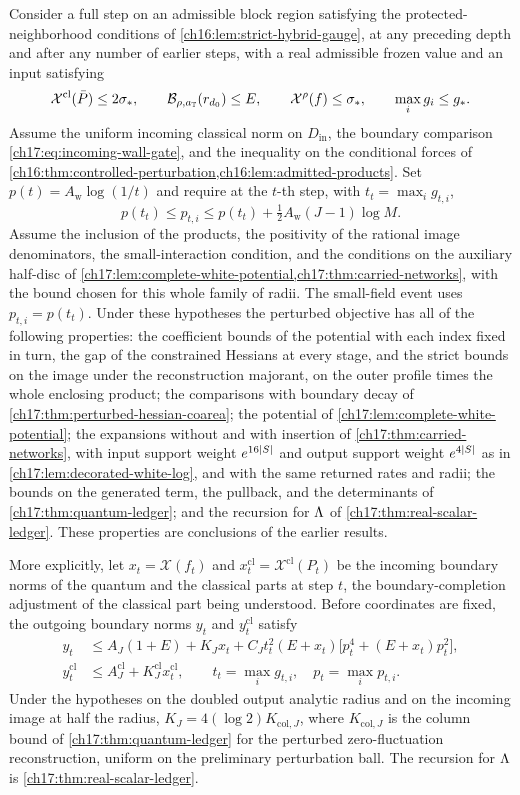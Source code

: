 \begin{theorem}
Consider a full step on an admissible block region satisfying the protected-neighborhood conditions of \cref{ch16:lem:strict-hybrid-gauge}, at any preceding depth and after any number of earlier steps, with a real admissible frozen value and an input satisfying
\[
 \mathcal X^{\mathrm{cl}}(\bar P)\le2\sigma_*,\qquad\mathcal B_{\rho,a_{\mathbb T}}(r_{d_0})\le E,\qquad\mathcal X^\rho(f)\le\sigma_*,\qquad\max_ig_i\le g_*.
\]
Assume the uniform incoming classical norm on $D_{\mathrm{in}}$, the boundary comparison \eqref{ch17:eq:incoming-wall-gate}, and the inequality on the conditional forces of \cref{ch16:thm:controlled-perturbation,ch16:lem:admitted-products}. Set $p(t)=A_{\mathrm w}\log(1/t)$ and require at the $t$-th step, with $t_t=\max_ig_{t,i}$,
\[
 p(t_t)\le p_{t,i}\le p(t_t)+\tfrac12A_{\mathrm w}(J-1)\log M.
\]
Assume the inclusion of the products, the positivity of the rational image denominators, the small-interaction condition, and the conditions on the auxiliary half-disc of \cref{ch17:lem:complete-white-potential,ch17:thm:carried-networks}, with the bound chosen for this whole family of radii. The small-field event uses $p_{t,i}=p(t_t)$. Under these hypotheses the perturbed objective has all of the following properties: the coefficient bounds of the potential with each index fixed in turn, the gap of the constrained Hessians at every stage, and the strict bounds on the image under the reconstruction majorant, on the outer profile times the whole enclosing product; the comparisons with boundary decay of \cref{ch17:thm:perturbed-hessian-coarea}; the potential of \cref{ch17:lem:complete-white-potential}; the expansions without and with insertion of \cref{ch17:thm:carried-networks}, with input support weight $e^{16\lvert S\rvert}$ and output support weight $e^{4\lvert S\rvert}$ as in \cref{ch17:lem:decorated-white-log}, and with the same returned rates and radii; the bounds on the generated term, the pullback, and the determinants of \cref{ch17:thm:quantum-ledger}; and the recursion for $\Lambda$ of \cref{ch17:thm:real-scalar-ledger}. These properties are conclusions of the earlier results.

More explicitly, let $x_t=\mathcal X(f_t)$ and $x_t^{\mathrm{cl}}=\mathcal X^{\mathrm{cl}}(P_t)$ be the incoming boundary norms of the quantum and the classical parts at step $t$, the boundary-completion adjustment of the classical part being understood. Before coordinates are fixed, the outgoing boundary norms $y_t$ and $y_t^{\mathrm{cl}}$ satisfy
\[
\begin{split}
 y_t&\le A_J(1+E)+K_Jx_t+C_Jt_t^2(E+x_t)\bigl[p_t^4+(E+x_t)p_t^2\bigr],\\
 y_t^{\mathrm{cl}}&\le A_J^{\mathrm{cl}}+K_J^{\mathrm{cl}}x_t^{\mathrm{cl}},\qquad t_t=\max_ig_{t,i},\quad p_t=\max_ip_{t,i}.
\end{split}
\]
Under the hypotheses on the doubled output analytic radius and on the incoming image at half the radius, $K_J=4(\log2)K_{\mathrm{col},J}$, where $K_{\mathrm{col},J}$ is the column bound of \cref{ch17:thm:quantum-ledger} for the perturbed zero-fluctuation reconstruction, uniform on the preliminary perturbation ball. The recursion for $\Lambda$ is \cref{ch17:thm:real-scalar-ledger}.


\end{theorem}
